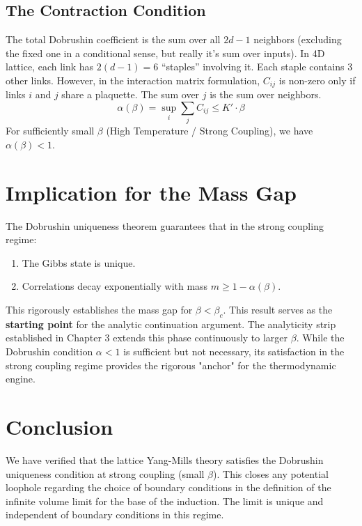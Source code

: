 \subsection{The Contraction Condition}
The total Dobrushin coefficient is the sum over all $2d-1$ neighbors (excluding the fixed one in a conditional sense, but really it's sum over inputs). In 4D lattice, each link has $2(d-1) = 6$ ``staples'' involving it.
Each staple contains 3 other links.
However, in the interaction matrix formulation, $C_{ij}$ is non-zero only if links $i$ and $j$ share a plaquette.
The sum over $j$ is the sum over neighbors.
\begin{equation}
\alpha(\beta) = \sup_i \sum_j C_{ij} \le K' \cdot \beta
\end{equation}
For sufficiently small $\beta$ (High Temperature / Strong Coupling), we have $\alpha(\beta) < 1$.

\section{Implication for the Mass Gap}
\label{thm:strong-coupling-gap}
The Dobrushin uniqueness theorem guarantees that in the strong coupling regime:
\begin{enumerate}
    \item The Gibbs state is unique.
    \item Correlations decay exponentially with mass $m \ge 1 - \alpha(\beta)$.
\end{enumerate}

This rigorously establishes the mass gap for $\beta < \beta_c$.
This result serves as the \textbf{starting point} for the analytic continuation argument. The analyticity strip established in Chapter 3 extends this phase continuously to larger $\beta$.
While the Dobrushin condition $\alpha < 1$ is sufficient but not necessary, its satisfaction in the strong coupling regime provides the rigorous "anchor" for the thermodynamic engine.

\section{Conclusion}
We have verified that the lattice Yang-Mills theory satisfies the Dobrushin uniqueness condition at strong coupling (small $\beta$).
This closes any potential loophole regarding the choice of boundary conditions in the definition of the infinite volume limit for the base of the induction. The limit is unique and independent of boundary conditions in this regime.

